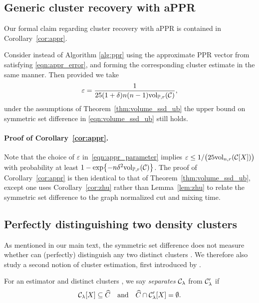 \subsection{Generic cluster recovery with aPPR}
\label{subsec:appr_volume_ssd_ub}
Our formal claim regarding cluster recovery with aPPR is contained in Corollary~\ref{cor:appr}.
\begin{corollary}
	\label{cor:appr}
	Consider instead of
	Algorithm \ref{alg:ppr} using the approximate PPR vector from
	\citet{andersen2006} satisfying \eqref{eqn:appr_error}, and forming the 
	corresponding cluster estimate  in the same manner.  Then 
	provided we take 
	\begin{equation}
	\label{eqn:appr_parameter}
	\varepsilon = \frac{1}{25(1 + \delta)n(n - 1)\mathrm{vol}_{\mathbb{P},r}(\mathcal{C})} ,
	\end{equation}
	under the assumptions of Theorem~\ref{thm:volume_ssd_ub} the upper bound on symmetric set difference in \eqref{eqn:volume_ssd_ub} still
	holds.
\end{corollary}	
\paragraph{Proof of Corollary~\ref{cor:appr}.}
	Note that the choice of $\varepsilon$ in~\eqref{eqn:appr_parameter} implies $\varepsilon \leq 1/\bigl(25\mathrm{vol}_{n,r}(\mathcal{C}[X])\bigr)$ with probability at least $1 - \exp\bigl\{-n\delta^2\mathrm{vol}_{\mathbb{P},r}(\mathcal{C})\bigr\}$. The proof of Corollary~\ref{cor:appr} is then identical to that of Theorem~\ref{thm:volume_ssd_ub}, except one uses Corollary~\ref{cor:zhu} rather than Lemma~\ref{lem:zhu} to relate the symmetric set difference to the graph normalized cut and mixing time.

\subsection{Perfectly distinguishing two density clusters}
\label{subsec:consistent_recovery_density_clusters}

As mentioned in our main text, the symmetric set difference does not measure whether 
can (perfectly) distinguish any two distinct clusters . We therefore also study a second notion of cluster 
estimation, first introduced by \citet{hartigan1981}.

\begin{definition}
	\label{def:density_cluster_consistency}
	For an estimator  and distinct clusters , we say  \emph{separates} $\mathcal{C}_{\lambda}$ from $\mathcal{C}_{\lambda}'$ if 
	\begin{equation}
	\label{eqn:density_cluster_consistency}
	\mathcal{C}_{\lambda}[X] \subseteq \widehat{C} \quad \text{and} \quad
	\widehat{C} \cap \mathcal{C}_{\lambda}'[X] = \emptyset.
	\end{equation}
\end{definition}

